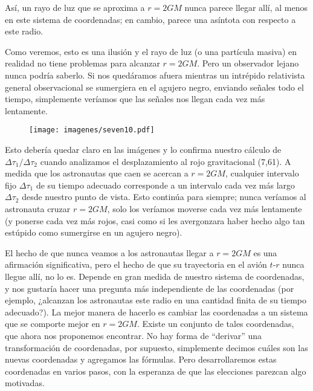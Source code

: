\documentclass[11pt,b5paper,openany,twoside]{book}
\begin{document}
\noindent
Así, un rayo de luz que se aproxima a $r=2GM$ nunca parece llegar allí, al menos en este sistema de coordenadas; en cambio, parece una asíntota con respecto a este radio.

Como veremos, esto es una ilusión y el rayo de luz (o una partícula masiva) en realidad no tiene problemas para alcanzar $r=2GM$.
Pero un observador lejano nunca podría saberlo.
Si nos quedáramos afuera mientras un intrépido relativista general observacional se sumergiera en el agujero negro, enviando señales todo el tiempo, simplemente veríamos que las señales nos llegan cada vez más lentamente.

\begin{figure}[h]
\centering
\texttt{[image: imagenes/seven10.pdf]}
\end{figure}
Esto debería quedar claro en las imágenes y lo confirma nuestro cálculo de $\Delta\tau_1/\Delta\tau_2$ cuando analizamos el desplazamiento al rojo gravitacional (7,61).
A medida que los astronautas que caen se acercan a $r=2GM$, cualquier intervalo fijo $\Delta\tau_1$ de su tiempo adecuado corresponde a un intervalo cada vez más largo $\Delta\tau_2$ desde nuestro punto de vista.
Esto continúa para siempre; nunca veríamos al astronauta cruzar $r=2GM$, solo los veríamos moverse cada vez más lentamente (y ponerse cada vez más rojos, casi como si les avergonzara haber hecho algo tan estúpido como sumergirse en un agujero negro).

El hecho de que nunca veamos a los astronautas llegar a $r=2GM$ es una afirmación significativa, pero el hecho de que su trayectoria en el avión $t$-$r$ nunca llegue allí, no lo es.
Depende en gran medida de nuestro sistema de coordenadas, y nos gustaría hacer una pregunta más independiente de las coordenadas (por ejemplo, ¿alcanzan los astronautas este radio en una cantidad finita de su tiempo adecuado?).
La mejor manera de hacerlo es cambiar las coordenadas a un sistema que se comporte mejor en $r=2GM$.
Existe un conjunto de tales coordenadas, que ahora nos proponemos encontrar.
No hay forma de ``derivar'' una transformación de coordenadas, por supuesto, simplemente decimos cuáles son las nuevas coordenadas y agregamos las fórmulas.
Pero desarrollaremos estas coordenadas en varios pasos, con la esperanza de que las elecciones parezcan algo motivadas.
\end{document}

